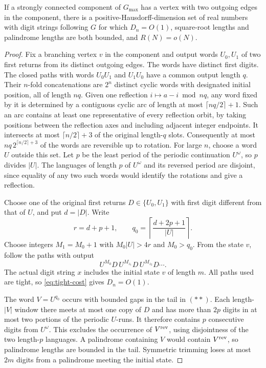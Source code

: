 \begin{theorem}\label{thm:branching-frequency}
If a strongly connected component of \(G_{\max}\) has a vertex with two outgoing edges in the component, there is a positive-Hausdorff-dimension set of real numbers with digit strings following \(G\) for which \(D_n=O(1)\), square-root lengths and palindrome lengths are both bounded, and \(R(N)=o(N)\).
\end{theorem}

\begin{proof}
Fix a branching vertex \(v\) in the component and output words \(U_0,U_1\) of two first returns from its distinct outgoing edges. The words have distinct first digits. The closed paths with words \(U_0U_1\) and \(U_1U_0\) have a common output length \(q\). Their \(n\)-fold concatenations are \(2^n\) distinct cyclic words with designated initial position, all of length \(nq\). Given one reflection \(i\mapsto a-i\bmod nq\), any word fixed by it is determined by a contiguous cyclic arc of length at most \(\lceil nq/2\rceil+1\). Such an arc contains at least one representative of every reflection orbit, by taking positions between the reflection axes and including adjacent integer endpoints. It intersects at most \(\lceil n/2\rceil+3\) of the original length-\(q\) slots. Consequently at most \(nq\,2^{\lceil n/2\rceil+3}\) of the words are reversible up to rotation. For large \(n\), choose a word \(U\) outside this set. Let \(p\) be the least period of the periodic continuation \(U^\omega\), so \(p\) divides \(|U|\). The languages of length \(p\) of \(U^\omega\) and its reversed period are disjoint, since equality of any two such words would identify the rotations and give a reflection.

Choose one of the original first returns \(D\in\{U_0,U_1\}\) with first digit different from that of \(U\), and put \(d=|D|\). Write
\[
 r=d+p+1,\qquad q_0=\left\lceil\frac{d+2p+1}{|U|}\right\rceil .
\]
Choose integers \(M_1=M_0+1\) with \(M_0|U|>4r\) and \(M_0>q_0\). From the state \(v\), follow the paths with output
\[
                  U^{M_0}D\,U^{M_{z_1}}D\,U^{M_{z_2}}D\cdots .
                                                        \tag{**}
\]
The actual digit string \(x\) includes the initial state \(v\) of length \(m\). All paths used are tight, so \eqref{eq:tight-cost} gives \(D_n=O(1)\).

The word \(V=U^{q_0}\) occurs with bounded gaps in the tail in \((**)\). Each length-\(|V|\) window there meets at most one copy of \(D\) and has more than \(2p\) digits in at most two portions of the periodic \(U\)-runs. It therefore contains \(p\) consecutive digits from \(U^\omega\). This excludes the occurrence of \(V^{\mathrm{rev}}\), using disjointness of the two length-\(p\) languages. A palindrome containing \(V\) would contain \(V^{\mathrm{rev}}\), so palindrome lengths are bounded in the tail. Symmetric trimming loses at most \(2m\) digits from a palindrome meeting the initial state.


\end{proof}
